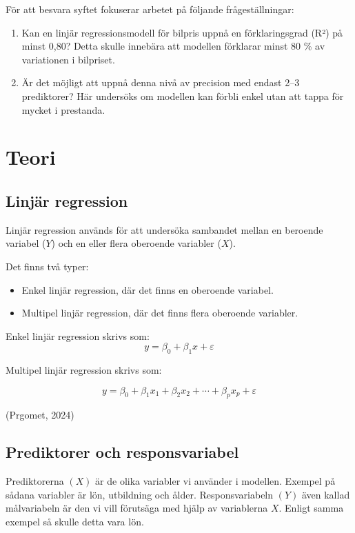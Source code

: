 \documentclass[
  letterpaper,
  DIV=11,
  numbers=noendperiod]{scrreprt}
\begin{document}
För att besvara syftet fokuserar arbetet på följande frågeställningar:

\begin{enumerate}
\def\labelenumi{\arabic{enumi}.}
\item
  Kan en linjär regressionsmodell för bilpris uppnå en förklaringsgrad
  (R²) på minst 0,80? Detta skulle innebära att modellen förklarar minst
  80 \% av variationen i bilpriset.
\item
  Är det möjligt att uppnå denna nivå av precision med endast 2--3
  prediktorer? Här undersöks om modellen kan förbli enkel utan att tappa
  för mycket i prestanda.
\end{enumerate}


\chapter{Teori}\label{teori}

\section{Linjär regression}\label{linjuxe4r-regression}

Linjär regression används för att undersöka sambandet mellan en beroende
variabel (\(Y\)) och en eller flera oberoende variabler (\(X\)).

Det finns två typer:

\begin{itemize}
\item
  Enkel linjär regression, där det finns en oberoende variabel.
\item
  Multipel linjär regression, där det finns flera oberoende variabler.
\end{itemize}

Enkel linjär regression skrivs som: \[
y = \beta_0 + \beta_1 x + \varepsilon
\]

Multipel linjär regression skrivs som:

\[
y = \beta_0 + \beta_1 x_1 + \beta_2 x_2 + \cdots + \beta_p x_p + \varepsilon
\]

(Prgomet, 2024)

\section{Prediktorer och
responsvariabel}\label{prediktorer-och-responsvariabel}

Prediktorerna \((X)\) är de olika variabler vi använder i modellen.
Exempel på sådana variabler är lön, utbildning och ålder.
Responsvariabeln \((Y)\) även kallad målvariabeln är den vi vill
förutsäga med hjälp av variablerna \(X\). Enligt samma exempel så skulle
detta vara lön.
\end{document}
